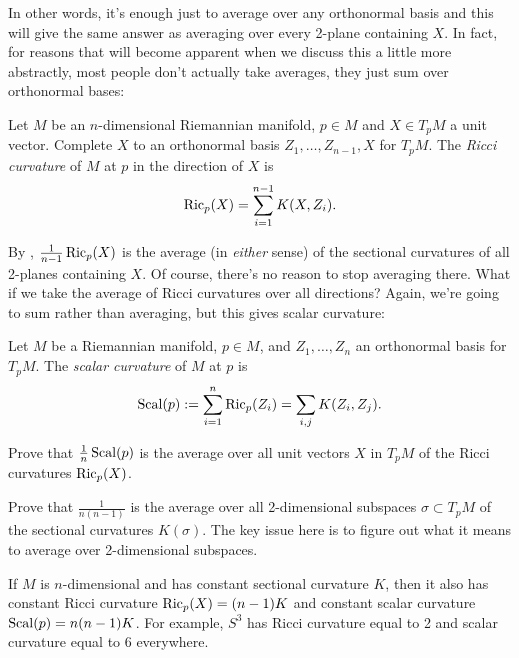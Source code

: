 In other words, it's enough just to average over any orthonormal basis and this will give the same answer as averaging over every 2-plane containing $X$. In fact, for reasons that will become apparent when we discuss this a little more abstractly, most people don't actually take averages, they just sum over orthonormal bases:

\begin{definition}\label{def:Ricci curvature}
	Let $M$ be an $n$-dimensional Riemannian manifold, $p \in M$ and $X \in T_pM$ a unit vector. Complete $X$ to an orthonormal basis $Z_1, \dots , Z_{n-1},X$ for $T_pM$. The \emph{Ricci curvature} of $M$ at $p$ in the direction of $X$ is
	\[
		\operatorname{Ric}_p(X) = \sum_{i=1}^{n-1} K(X,Z_i).
	\]
\end{definition}

By , $\frac{1}{n-1} \operatorname{Ric}_p(X)$ is the average (in \emph{either} sense) of the sectional curvatures of all 2-planes containing $X$. Of course, there's no reason to stop averaging there. What if we take the average of Ricci curvatures over all directions? Again, we're going to sum rather than averaging, but this gives scalar curvature:

\begin{definition}\label{def:scalar curvature}
	Let $M$ be a Riemannian manifold, $p \in M$, and $Z_1, \dots , Z_n$ an orthonormal basis for $T_pM$. The \emph{scalar curvature} of $M$ at $p$ is
	\[
		\operatorname{Scal}(p) := \sum_{i=1}^n \operatorname{Ric}_p(Z_i) = \sum_{i,j} K(Z_i,Z_j).
	\]
\end{definition}

\begin{exercise}
	Prove that $\frac{1}{n} \operatorname{Scal}(p)$ is the average over all unit vectors $X$ in $T_pM$ of the Ricci curvatures $\operatorname{Ric}_p(X)$.
\end{exercise}

\begin{exercise}
	Prove that $\frac{1}{n(n-1)}$ is the average over all 2-dimensional subspaces $\sigma \subset T_pM$ of the sectional curvatures $K(\sigma)$. The key issue here is to figure out what it means to average over 2-dimensional subspaces.
\end{exercise}

\begin{example}
	If $M$ is $n$-dimensional and has constant sectional curvature $K$, then it also has constant Ricci curvature $\operatorname{Ric}_p(X) = (n-1)K$ and constant scalar curvature $\operatorname{Scal}(p) = n(n-1)K$. For example, $S^3$ has Ricci curvature equal to 2 and scalar curvature equal to 6 everywhere.
\end{example}

